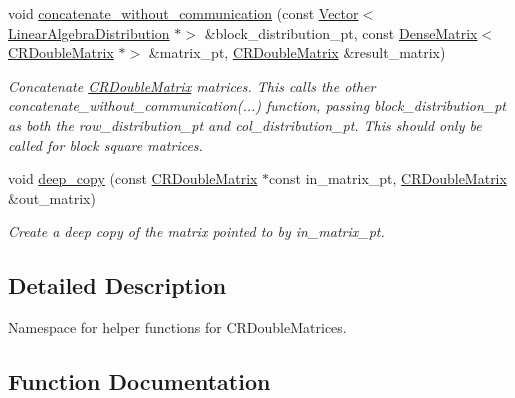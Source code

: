 \begin{DoxyCompactItemize}
void \hyperlink{namespaceoomph_1_1CRDoubleMatrixHelpers_a53d5c536ca841d3d4fae5feb78448b0a}{concatenate\+\_\+without\+\_\+communication} (const \hyperlink{classoomph_1_1Vector}{Vector}$<$ \hyperlink{classoomph_1_1LinearAlgebraDistribution}{Linear\+Algebra\+Distribution} $\ast$$>$ \&block\+\_\+distribution\+\_\+pt, const \hyperlink{classoomph_1_1DenseMatrix}{Dense\+Matrix}$<$ \hyperlink{classoomph_1_1CRDoubleMatrix}{C\+R\+Double\+Matrix} $\ast$$>$ \&matrix\+\_\+pt, \hyperlink{classoomph_1_1CRDoubleMatrix}{C\+R\+Double\+Matrix} \&result\+\_\+matrix)
\begin{DoxyCompactList}\small\item\em Concatenate \hyperlink{classoomph_1_1CRDoubleMatrix}{C\+R\+Double\+Matrix} matrices. This calls the other concatenate\+\_\+without\+\_\+communication(...) function, passing block\+\_\+distribution\+\_\+pt as both the row\+\_\+distribution\+\_\+pt and col\+\_\+distribution\+\_\+pt. This should only be called for block square matrices. \end{DoxyCompactList}\item 
void \hyperlink{namespaceoomph_1_1CRDoubleMatrixHelpers_a157511f700993ab8bc014f9d0d44f4c7}{deep\+\_\+copy} (const \hyperlink{classoomph_1_1CRDoubleMatrix}{C\+R\+Double\+Matrix} $\ast$const in\+\_\+matrix\+\_\+pt, \hyperlink{classoomph_1_1CRDoubleMatrix}{C\+R\+Double\+Matrix} \&out\+\_\+matrix)
\begin{DoxyCompactList}\small\item\em Create a deep copy of the matrix pointed to by in\+\_\+matrix\+\_\+pt. \end{DoxyCompactList}\end{DoxyCompactItemize}


\subsection{Detailed Description}
Namespace for helper functions for C\+R\+Double\+Matrices. 

\subsection{Function Documentation}
\mbox{\label{namespaceoomph_1_1CRDoubleMatrixHelpers_aba5724bb1f89625f601045ba6ad139bf}} 

